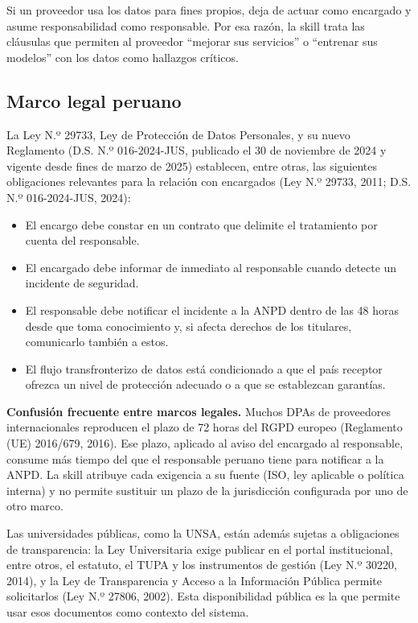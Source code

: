 \documentclass[12pt,letterpaper]{article}
\begin{document}
Si un proveedor usa los datos para fines propios, deja de actuar como encargado y asume responsabilidad como responsable. Por esa razón, la skill trata las cláusulas que permiten al proveedor ``mejorar sus servicios'' o ``entrenar sus modelos'' con los datos como hallazgos críticos.

\subsection{Marco legal peruano}

La Ley N.º 29733, Ley de Protección de Datos Personales, y su nuevo Reglamento (D.S. N.º 016-2024-JUS, publicado el 30 de noviembre de 2024 y vigente desde fines de marzo de 2025) establecen, entre otras, las siguientes obligaciones relevantes para la relación con encargados (Ley N.º 29733, 2011; D.S. N.º 016-2024-JUS, 2024):

\begin{itemize}
  \item El encargo debe constar en un contrato que delimite el tratamiento por cuenta del responsable.
  \item El encargado debe informar de inmediato al responsable cuando detecte un incidente de seguridad.
  \item El responsable debe notificar el incidente a la ANPD dentro de las 48 horas desde que toma conocimiento y, si afecta derechos de los titulares, comunicarlo también a estos.
  \item El flujo transfronterizo de datos está condicionado a que el país receptor ofrezca un nivel de protección adecuado o a que se establezcan garantías.
\end{itemize}

\par\noindent \textbf{Confusión frecuente entre marcos legales.} Muchos DPAs de proveedores internacionales reproducen el plazo de 72 horas del RGPD europeo (Reglamento (UE) 2016/679, 2016). Ese plazo, aplicado al aviso del encargado al responsable, consume más tiempo del que el responsable peruano tiene para notificar a la ANPD. La skill atribuye cada exigencia a su fuente (ISO, ley aplicable o política interna) y no permite sustituir un plazo de la jurisdicción configurada por uno de otro marco.
\par

Las universidades públicas, como la UNSA, están además sujetas a obligaciones de transparencia: la Ley Universitaria exige publicar en el portal institucional, entre otros, el estatuto, el TUPA y los instrumentos de gestión (Ley N.º 30220, 2014), y la Ley de Transparencia y Acceso a la Información Pública permite solicitarlos (Ley N.º 27806, 2002). Esta disponibilidad pública es la que permite usar esos documentos como contexto del sistema.
\end{document}
